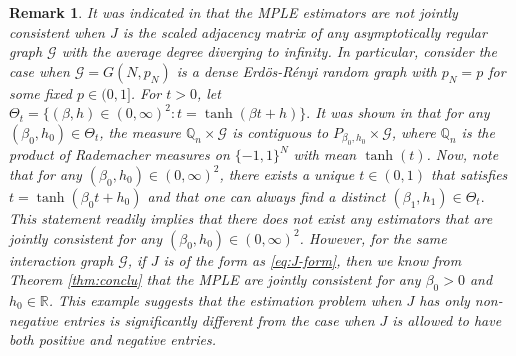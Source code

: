 \documentclass[letterpaper,11pt,reqno]{amsart}
\newtheorem{rem}[thm]{Remark}
\begin{document}
\begin{rem}\rm
        It was indicated in \cite{GM20} that the MPLE estimators are not jointly consistent when $J$ is the scaled adjacency matrix of any asymptotically regular graph $\mathcal{G}$ with the average degree diverging to infinity. In particular, consider the case when  $\mathcal{G}=G(N,p_N)$ is a dense Erd\"os-R\'enyi random graph with $p_N=p$ for some fixed $p\in (0,1]$.
        For $t>0$, let $\Theta_t = \{ (\beta, h) \in (0, \infty)^2: t = \tanh(\beta t+ h)\}.$
        It was shown in \cite[Theorem 1.6]{GM20} that for any $(\beta_0,h_0)\in \Theta_t$, the measure $\mathbb{Q}_n \times \mathcal{G} $ is contiguous to $P_{\beta_0, h_0} \times \mathcal{G} $, where $\mathbb{Q}_n$ is the product of Rademacher measures on $\{-1, 1\}^N$ with mean $\tanh (t)$. Now, note that for any $(\beta_0,h_0)\in (0,\infty)^2$, there exists a unique $t\in (0,1)$ that satisfies $t=\tanh(\beta_0t+h_0)$ and that  one can always find a distinct $(\beta_1,h_1)\in \Theta_t.$ This statement readily implies that there does not exist any estimators that are jointly consistent for any $(\beta_0,h_0)\in (0,\infty)^2$. However, for the same interaction graph $\mathcal{G}$, if $J$ is of the form as  \eqref{eq:J-form}, then we know from Theorem \ref{thm:conclu} that the MPLE are jointly consistent for any $\beta_0>0$ and $h_0 \in \mathbb{R}$. This example suggests that the estimation problem when $J$ has only non-negative entries is significantly different from the case when $J$ is allowed to have both positive and negative entries. 
\end{rem}
\end{document}

